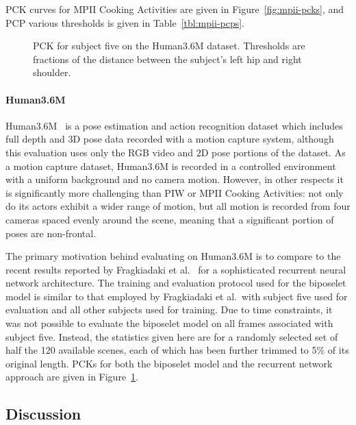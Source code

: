 \documentclass[runningheads]{llncs}
\begin{document}
PCK curves for MPII Cooking Activities are given in Figure~\ref{fig:mpii-pcks},
and PCP various thresholds is given in Table~\ref{tbl:mpii-pcps}.

\begin{figure}[t]
\begin{center}

\end{center}
\vspace{-10mm}
\caption{PCK for subject five on the Human3.6M dataset. Thresholds are fractions
of the distance between the subject's left hip and right shoulder.}
\label{fig:h36m-pck}
\end{figure}

\paragraph{Human3.6M} Human3.6M~\cite{ionescu2014human,ionescu2011latent} is a
pose estimation and action recognition dataset which includes full depth and 3D
pose data recorded with a motion capture system, although this evaluation uses
only the RGB video and 2D pose portions of the dataset. As a motion capture
dataset, Human3.6M is recorded in a controlled environment with a uniform
background and no camera motion. However, in other respects it is significantly
more challenging than PIW or MPII Cooking Activities: not only do its actors
exhibit a wider range of motion, but all motion is recorded from four cameras
spaced evenly around the scene, meaning that a significant portion of poses are
non-frontal.

The primary motivation behind evaluating on Human3.6M is to compare to the
recent results reported by Fragkiadaki et al.~\cite{fragkiadaki2015recurrent}
for a sophisticated recurrent neural network architecture. The training and
evaluation protocol used for the biposelet model is similar to that employed by
Fragkiadaki et al.\, with subject five used for evaluation and all other
subjects used for training. Due to time constraints, it was not possible to
evaluate the biposelet model on all frames associated with subject five.
Instead, the statistics given here are for a randomly selected set of half the
120 available scenes, each of which has been further trimmed to 5\% of its
original length. PCKs for both the biposelet model and the recurrent network
approach are given in Figure~\ref{fig:h36m-pck}.

\subsection{Discussion}\label{sec:discussion}
\end{document}
